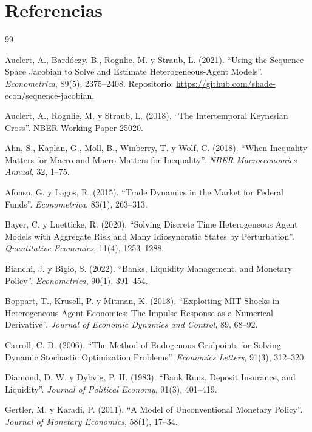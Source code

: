 \chapter{Referencias}

\begin{thebibliography}{99}
\small

 Auclert, A., Bardóczy, B., Rognlie, M. y Straub, L. (2021).
``Using the Sequence-Space Jacobian to Solve and Estimate Heterogeneous-Agent
Models''. \emph{Econometrica}, 89(5), 2375--2408.
Repositorio: \url{https://github.com/shade-econ/sequence-jacobian}.

 Auclert, A., Rognlie, M. y Straub, L. (2018).
``The Intertemporal Keynesian Cross''. NBER Working Paper 25020.

 Ahn, S., Kaplan, G., Moll, B., Winberry, T. y Wolf, C. (2018).
``When Inequality Matters for Macro and Macro Matters for Inequality''.
\emph{NBER Macroeconomics Annual}, 32, 1--75.

 Afonso, G. y Lagos, R. (2015).
``Trade Dynamics in the Market for Federal Funds''. \emph{Econometrica}, 83(1), 263--313.

 Bayer, C. y Luetticke, R. (2020).
``Solving Discrete Time Heterogeneous Agent Models with Aggregate Risk and Many
Idiosyncratic States by Perturbation''. \emph{Quantitative Economics}, 11(4), 1253--1288.

 Bianchi, J. y Bigio, S. (2022).
``Banks, Liquidity Management, and Monetary Policy''. \emph{Econometrica}, 90(1), 391--454.

 Boppart, T., Krusell, P. y Mitman, K. (2018).
``Exploiting MIT Shocks in Heterogeneous-Agent Economies: The Impulse Response as a
Numerical Derivative''. \emph{Journal of Economic Dynamics and Control}, 89, 68--92.

 Carroll, C. D. (2006).
``The Method of Endogenous Gridpoints for Solving Dynamic Stochastic Optimization
Problems''. \emph{Economics Letters}, 91(3), 312--320.

 Diamond, D. W. y Dybvig, P. H. (1983).
``Bank Runs, Deposit Insurance, and Liquidity''.
\emph{Journal of Political Economy}, 91(3), 401--419.

 Gertler, M. y Karadi, P. (2011).
``A Model of Unconventional Monetary Policy''.
\emph{Journal of Monetary Economics}, 58(1), 17--34.


\end{thebibliography}
